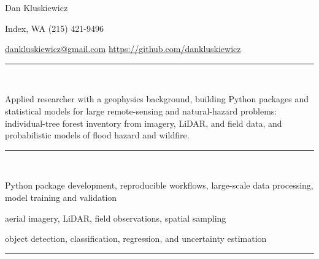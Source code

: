 \documentclass[10pt]{article}
\begin{document}

\centerline{{\Huge \sc Dan Kluskiewicz}}  %
\centerline{Index, WA \textbullet \hspace{5pt} (215) 421-9496}
\centerline{\href{mailto:dankluskiewicz@gmail.com}{dankluskiewicz@gmail.com} 
\textbullet \hspace{5pt}  \url{https://github.com/dankluskiewicz}
}

\noindent

\vspace{1.5mm}
\noindent
\rule{\textwidth}{0.4pt}\\
\vspace{1.5mm}



\noindent Applied researcher with a geophysics background, building Python packages and statistical models for large remote-sensing and natural-hazard problems: individual-tree forest inventory from imagery, LiDAR, and field data, and probabilistic models of flood hazard and wildfire.

\vspace{1.5mm}
\noindent
\rule{\textwidth}{0.4pt}\\
\vspace{1.5mm}


 Python package development, reproducible workflows, large-scale data processing, model training and validation

 aerial imagery, LiDAR, field observations, spatial sampling

 object detection, classification, regression, and uncertainty estimation

\vspace{1.5mm}
\noindent
\rule{\textwidth}{0.4pt}\\
\vspace{1.5mm}

\end{document}
